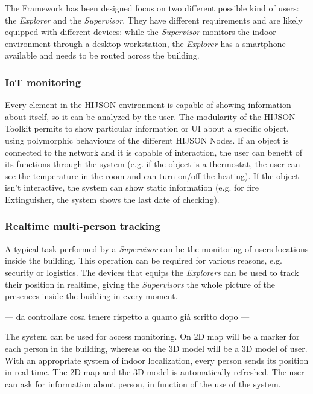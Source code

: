 \documentclass{sig-alternate}
\begin{document}
The Framework has been designed focus on two different possible kind of
users: the \emph{Explorer} and the \emph{Supervisor}. They have
different requirements and are likely equipped with different devices:
while the \emph{Supervisor} monitors the indoor environment through a
desktop workstation, the \emph{Explorer} has a smartphone available and
needs to be routed across the building.

\subsubsection{IoT monitoring}\label{iot-monitoring}

Every element in the HIJSON environment is capable of showing information about itself, 
so it can be analyzed by the user. The modularity of the HIJSON Toolkit permits to show
 particular information or UI about a specific object, using polymorphic behaviours of the
different HIJSON Nodes. If an object is connected to the network and it is capable of
interaction, the user can benefit of its functions through the system (e.g. if the object
is a thermostat, the user can see the temperature in the room and can turn on/off the heating).
If the object isn't interactive, the system can show static information (e.g. for fire
Extinguisher, the system shows the last date of checking).

\subsubsection{Realtime multi-person tracking}\label{realtime-multi-person-tracking}

A typical task performed by a \emph{Supervisor} can be the monitoring of users locations 
inside the building. This operation can be required for various reasons, e.g. security or 
logistics. The devices that equips the \emph{Explorers} can be used to track their position 
in realtime, giving the \emph{Supervisors} the whole picture of the presences inside the 
building in every moment.

--- da controllare cosa tenere rispetto a quanto già scritto dopo ---

The system can be used for access monitoring. On 2D map will be a marker
for each person in the building, whereas on the 3D model will be a 3D
model of user. With an appropriate system of indoor localization, every
person sends its position in real time. The 2D map and the 3D model is
automatically refreshed. The user can ask for information about person,
in function of the use of the system.
\end{document}
